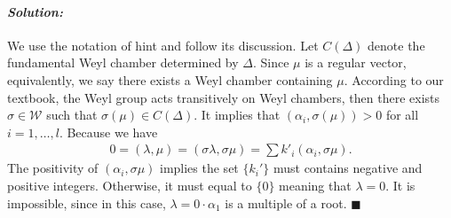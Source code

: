 \documentclass[12pt, a4paper]{article}
\newenvironment{solution}
  {\paragraph{\textit{Solution:}}\par\medskip}
  {\hfill$\blacksquare$\vspace{0.1cm}}
\begin{document}
\begin{solution}
  We use the notation of hint and follow its discussion.  
  Let $C(\Delta)$ denote the fundamental Weyl chamber determined by $\Delta$. Since $\mu$ is a regular vector, equivalently, we say there exists a Weyl chamber containing $\mu$.
  According to our textbook, the Weyl group acts transitively on Weyl chambers, then there exists $\sigma\in \mathcal{W}$ such that $\sigma(\mu)\in C(\Delta)$.
  It implies that $(\alpha_i,\sigma(\mu))>0$ for all $i=1,\dots,l$. Because we have
  \begin{align*}
    0 = (\lambda, \mu) = (\sigma \lambda, \sigma \mu) = \sum k'_i (\alpha_i, \sigma \mu).
  \end{align*}
  The positivity of $(\alpha_i, \sigma \mu)$ implies the set $\{k_i'\}$ must contains negative and positive integers. Otherwise, it must equal to $\{0\}$ meaning that $\lambda=0$. It is impossible, since in this case, $\lambda = 0\cdot \alpha_1$ is a multiple of a root. 
\end{solution}
\end{document}
